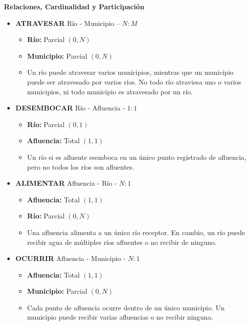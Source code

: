 \textbf{Relaciones, Cardinalidad y Participación}

\begin{itemize}
    \item \textbf{ATRAVESAR} Río - Municipio -- $N:M$
    \begin{itemize}

        \item \textbf{Río:} Parcial $(0,N)$
        \item \textbf{Municipio:} Parcial $(0,N)$
        \item Un río puede atravesar varios municipios, mientras que un municipio puede ser atravesado por varios ríos. No todo río atraviesa uno o varios municipios, ni todo municipio es atravesado por un río. 
    \end{itemize}

    \item \textbf{DESEMBOCAR} Río - Afluencia - $1:1$
    \begin{itemize}
        \item \textbf{Río:} Parcial $(0,1)$
        \item \textbf{Afluencia:} Total $(1,1)$
        \item Un río si es afluente esemboca en un único punto registrado de afluencia, pero no todos los ríos son afluentes. 
    \end{itemize}

    \item \textbf{ALIMENTAR} Afluencia - Río - $N:1$
    \begin{itemize}
        \item \textbf{Afluencia:} Total $(1,1)$
        \item \textbf{Río:} Parcial $(0,N)$
        \item Una afluencia alimenta a un único río receptor. En cambio, un río puede recibir agua de múltiples ríos afluentes o no recibir de ninguno.
    \end{itemize}

    \item \textbf{OCURRIR} Afluencia - Municipio - $N:1$
    \begin{itemize}
  
        \item \textbf{Afluencia:} Total $(1,1)$
        \item \textbf{Municipio:} Parcial $(0,N)$
        \item Cada punto de afluencia ocurre dentro de un único municipio. Un municipio puede recibir varias afluencias o no recibir ninguna.
    \end{itemize}


\end{itemize}
